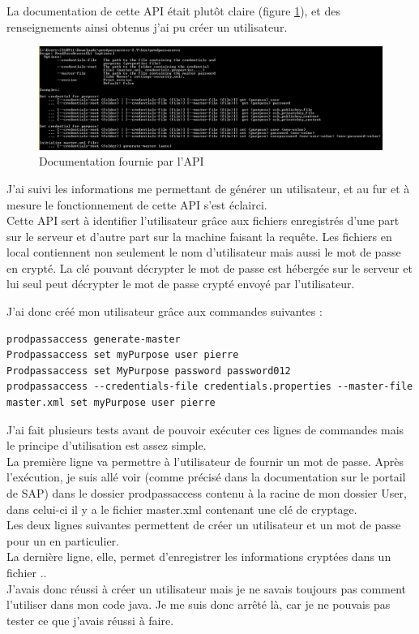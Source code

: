 La documentation de cette API était plutôt claire (figure \ref{figure:prodpassaccessdoc}), et des renseignements ainsi obtenus j'ai pu créer un utilisateur.
\begin{figure}[!h]
  \centering
      \includegraphics[width=\textwidth]{images/prodpassaccessdoc.png}
  \caption{Documentation fournie par l'API}
	\label{figure:prodpassaccessdoc}
\end{figure}


J'ai suivi les informations me permettant de générer un utilisateur, et au fur et à mesure le fonctionnement de cette API s'est éclairci.\\
Cette API sert à identifier l'utilisateur grâce aux fichiers enregistrés d'une part sur le serveur et d'autre part sur la machine faisant la requête. Les fichiers en local contiennent non seulement le nom d'utilisateur mais aussi le mot de passe en crypté. La clé pouvant décrypter le mot de passe est hébergée sur le serveur et lui seul peut décrypter le mot de passe crypté envoyé par l'utilisateur.

J'ai donc créé mon utilisateur grâce aux commandes suivantes :\\
\begin{lstlisting}
prodpassaccess generate-master 
Prodpassaccess set myPurpose user pierre
Prodpassaccess set MyPurpose password password012
prodpassaccess --credentials-file credentials.properties --master-file master.xml set myPurpose user pierre
\end{lstlisting}

J'ai fait plusieurs tests avant de pouvoir exécuter ces lignes de commandes mais le principe d'utilisation est assez simple.\\
La première ligne va permettre à l'utilisateur de fournir un mot de passe. Après l'exécution, je suis allé voir (comme précisé dans la documentation sur le portail de SAP) dans le dossier prodpassaccess contenu à la racine de mon dossier User, dans celui-ci il y a le fichier master.xml contenant une clé de cryptage.\\
Les deux lignes suivantes permettent de créer un utilisateur et un mot de passe pour un  en particulier.\\
La dernière ligne, elle, permet d'enregistrer les informations cryptées dans un fichier ..\\
J'avais donc réussi à créer un utilisateur mais je ne savais toujours pas comment l'utiliser dans mon code java. Je me suis donc arrêté là, car je ne pouvais pas tester ce que j'avais réussi à faire.\\







